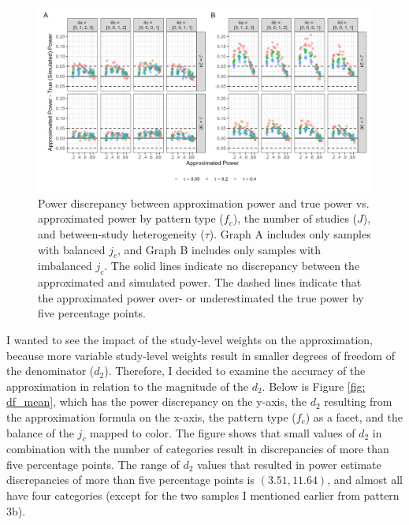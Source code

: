 \begin{figure}
    \centering
    \vspace{-5pt}\includegraphics[width=\linewidth]{chapters/plots/fc_J_bal_empirical_bal_all.png}\caption{Power discrepancy between approximation power and true power vs. approximated power by pattern type ($f_c$), the number of studies ($J$), and between-study heterogeneity ($\tau$). Graph A includes only samples with balanced $j_c$, and Graph B includes only samples with imbalanced $j_c$. The solid lines indicate no discrepancy between the approximated and simulated power. The dashed lines indicate that the approximated power over- or underestimated the true power by five percentage points.\label{fig: fc_J_bal_empirical_bal_all}}
    \vspace{-5pt}
\end{figure}


I wanted to see the impact of the study-level weights on the approximation, because more variable study-level weights result in smaller degrees of freedom of the denominator ($d_2$). Therefore, I decided to examine the accuracy of the approximation in relation to the magnitude of the $d_2$. Below is Figure \ref{fig: df_mean}, which has the power discrepancy on the y-axis, the $d_2$ resulting from the approximation formula on the x-axis, the pattern type ($f_c$) as a facet, and the balance of the $j_c$ mapped to color. The figure shows that small values of $d_2$ in combination with the number of categories result in discrepancies of more than five percentage points. The range of $d_2$ values that resulted in power estimate discrepancies of more than five percentage points is $(3.51, 11.64)$, and almost all have four categories (except for the two samples I mentioned earlier from pattern 3b). 

